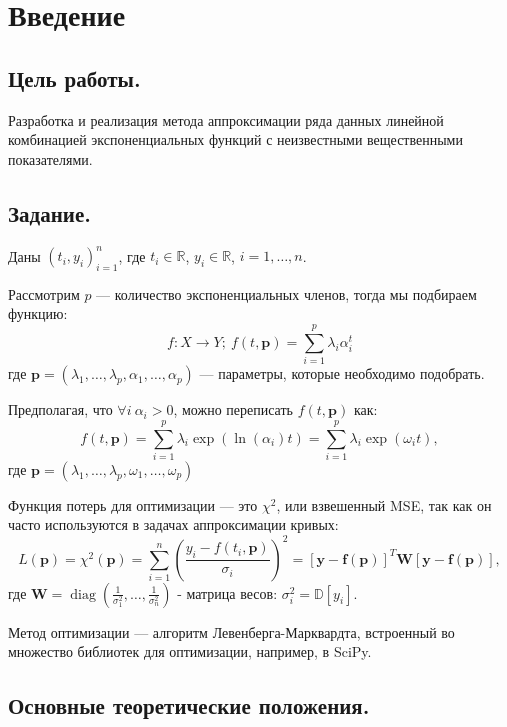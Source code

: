 \tableofcontents

\newpage

\section*{Введение}

\subsection*{Цель работы.}

Разработка и реализация метода аппроксимации ряда данных линейной комбинацией экспоненциальных функций с неизвестными вещественными показателями.

\subsection*{Задание.}
Даны $(t_i, y_i)_{i=1}^n$, где $t_i \in \mathbb{R}$, $y_i \in \mathbb{R}$, $i = 1, \ldots, n$.

Рассмотрим $p$ — количество экспоненциальных членов, тогда мы подбираем функцию:
$$
	f: X \to Y; \:
	f(t, \textbf{p}) =\sum_{i=1}^p\lambda_i\alpha_i^t
$$
где $\textbf{p} = (\lambda_1, \ldots, \lambda_p, \alpha_1, \ldots, \alpha_p)$ — параметры, которые необходимо подобрать.

Предполагая, что $\forall i \:\alpha_i > 0$, можно переписать $f(t, \textbf{p})$ как:
$$
	f(t, \textbf{p})=\sum_{i=1}^p\lambda_i\exp(\ln(\alpha_i)t) =
	\sum_{i=1}^p\lambda_i\exp(\omega_it),
$$
где $\textbf{p} = (\lambda_1, \ldots, \lambda_p, \omega_1, \ldots, \omega_p)$

Функция потерь для оптимизации — это $\chi^2$, или взвешенный MSE, так как он часто используются в задачах аппроксимации кривых:
$$
	L(\mathbf{p}) = \chi^2(\boldsymbol p) = \sum_{i=1}^n\left(\frac{y_i-f(t_i, \boldsymbol p)}{\sigma_i}\right)^2 = \left[\mathbf y - \mathbf f\left ( \mathbf{p}\right )\right ]^T\boldsymbol{W}\left[\mathbf y - \mathbf f\left ( \mathbf{p}\right )\right ],
$$
где $\boldsymbol{W} = \operatorname{diag}\left(\frac{1}{\sigma_1^2}, \ldots, \frac{1}{\sigma_n^2}\right)$ - матрица весов: $\sigma_i^2=\mathbb{D}[y_i]$.

Метод оптимизации — алгоритм Левенберга-Марквардта, встроенный во множество библиотек для оптимизации, например, в SciPy.

\subsection*{Основные теоретические положения.}

